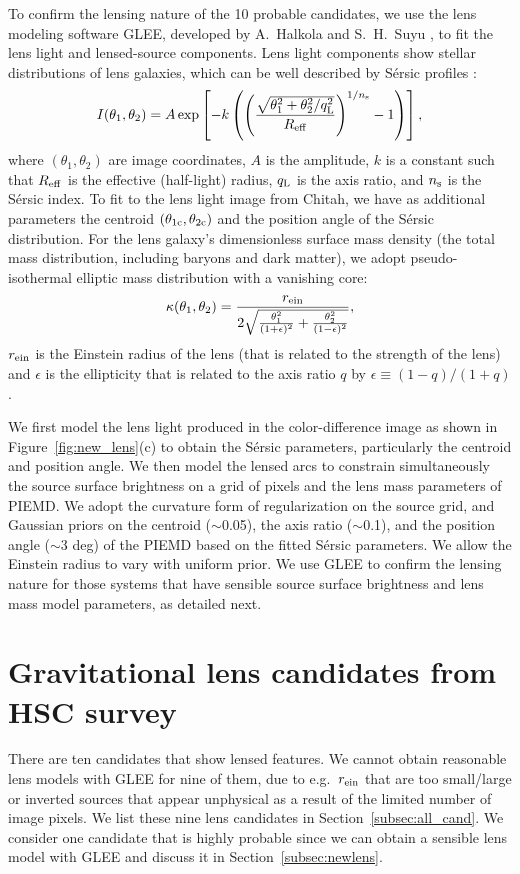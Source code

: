 \documentclass[apj]{emulateapj}
\newcommand{\be}{\begin{equation}}
\newcommand{\ee}{\end{equation}}
\def\rein{r_{\rm ein}}
\def\chitah{{\sc Chitah}}
\newcommand{\sref}[1]{Section~\ref{#1}}
\newcommand{\fref}[1]{Figure~\ref{#1}}
\begin{document}
To confirm the lensing nature of the 10 probable candidates, we use the lens modeling software GLEE, developed by A.~Halkola and S.~H.~Suyu \citep{Suyu&Halkola10, SuyuEtal12},
to fit the lens light and lensed-source components. 
Lens light components show stellar distributions of lens galaxies, which can be well described by S{\'e}rsic profiles \citep{Sersic63}:
\be
\label{eq:sersic}
I(\theta_1,\theta_2) = A \exp \left[ -k \left (\left(\frac{\sqrt{\theta_1^2 +
      \theta_2^2/q_{\rm L}^2}}{R_{\rm eff}}\right) ^ {1/n_{\rm
    s}} - 1 \right) \right],
\ee
where $(\theta_1,\theta_2)$ are image coordinates, $A$ is the amplitude, $k$ is a constant such that $R_{\rm eff}$ is the effective (half-light) radius, $q_{\rm L}$ is the axis ratio, and $n_{\rm s}$ is the S{\'e}rsic index.  To fit to the lens light image from \chitah, we have as additional parameters the centroid $(\theta_{\rm 1c},\theta_{\rm 2c})$ and the position angle of the S{\'e}rsic distribution.
%
For the lens galaxy's dimensionless surface mass density (the total mass distribution, including baryons and dark matter), 
we adopt pseudo-isothermal elliptic mass distribution \citep[PIEMD;][]{Kassiola&Kovner93} with a vanishing core:
\be
\label{eq:piemd}
\kappa(\theta_1, \theta_2) = \frac{\rein}{2\sqrt{\frac{{\theta_1^2}}{(1+\epsilon)^2}+\frac{\theta_2^2}{(1-\epsilon)^2}}},
\ee
$\rein$ is the Einstein radius of the lens (that is related to the strength of the lens) and $\epsilon$ is the ellipticity that is related to the axis ratio $q$ by $\epsilon \equiv (1-q)/(1+q)$.  
%
 
We first model the lens light produced in the color-difference image as shown in \fref{fig:new_lens}(c) to obtain the S{\'e}rsic parameters, particularly the centroid and position angle. 
We then model the lensed arcs to constrain simultaneously the source surface brightness on a grid of pixels and the lens mass parameters of PIEMD.  
We adopt the curvature form of regularization on the source grid, 
and Gaussian priors on the centroid ($\sim$0.05\arcsec), the axis ratio ($\sim$0.1), and the  position angle ($\sim$3 deg) of the PIEMD based on the fitted S{\'e}rsic parameters.  
We allow the Einstein radius to vary with uniform prior.
We use GLEE to confirm the lensing nature for those systems that have sensible source surface brightness and lens mass model parameters, as detailed next.

\section{Gravitational lens candidates from HSC survey}
\label{sec:candidates}
There are ten candidates that show lensed features.
We cannot obtain reasonable lens models with GLEE for nine of them, due to e.g.~$\rein$ that are too small/large or inverted sources that appear unphysical as a result of the limited number of image pixels.
We list these nine lens candidates in \sref{subsec:all_cand}.
We consider one candidate that is highly probable since we can obtain a sensible lens model with GLEE and discuss it in \sref{subsec:newlens}.
\end{document}
